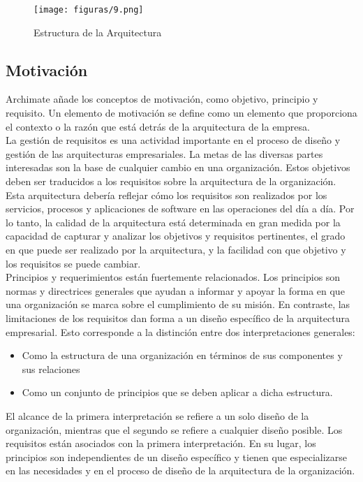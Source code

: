   \begin{figure}[!h]
   	\centering
   	\texttt{[image: figuras/9.png]}
   	\captionsetup{width=.95\textwidth}
   	\caption{Estructura de la Arquitectura}
   	\label{figura9}
  \end{figure}

  \subsection{Motivación}
  Archimate añade los conceptos de motivación, como objetivo, principio y requisito. Un elemento de motivación se define como un elemento que proporciona el contexto o la razón que está detrás de la arquitectura de la empresa. \\
  
  La gestión de requisitos es una actividad importante en el proceso de diseño y gestión de las arquitecturas empresariales. La metas de las diversas partes interesadas son la base de cualquier cambio en una organización. Estos objetivos deben ser traducidos a los requisitos sobre la arquitectura de la organización. Esta arquitectura debería reflejar cómo los requisitos son realizados por los servicios, procesos y aplicaciones de software en las operaciones del día a día. Por lo tanto, la calidad de la arquitectura está determinada en gran medida por la capacidad de capturar y analizar los objetivos y requisitos pertinentes, el grado en que puede ser realizado por la arquitectura, y la facilidad con que objetivo y los requisitos se puede cambiar. \\
  
  Principios y requerimientos están fuertemente relacionados. Los principios son normas y directrices generales que ayudan a informar y apoyar la forma en que una organización se marca sobre el cumplimiento de su misión. En contraste, las limitaciones de los requisitos dan forma a un diseño específico de la arquitectura empresarial. Esto corresponde a la distinción entre dos interpretaciones generales:
  \begin{itemize}
  	\item Como la estructura de una organización en términos de sus componentes y sus relaciones
  	\item Como un conjunto de principios que se deben aplicar a dicha estructura.
  \end{itemize}
  El alcance de la primera interpretación se refiere a un solo diseño de la organización, mientras que el segundo se refiere a cualquier diseño posible. Los requisitos están asociados con la primera interpretación. En su lugar, los principios son independientes de un diseño específico y tienen que especializarse en las necesidades y en el proceso de diseño de la arquitectura de la organización. \\
  
